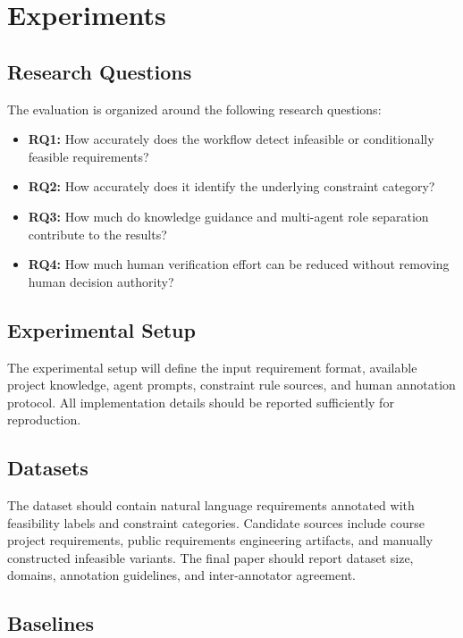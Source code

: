 \section{Experiments}
\label{experiments}

\subsection{Research Questions}
\label{exp:rqs}

The evaluation is organized around the following research questions:
\begin{itemize}[leftmargin=*]
  \item \textbf{RQ1:} How accurately does the workflow detect infeasible or conditionally feasible requirements?
  \item \textbf{RQ2:} How accurately does it identify the underlying constraint category?
  \item \textbf{RQ3:} How much do knowledge guidance and multi-agent role separation contribute to the results?
  \item \textbf{RQ4:} How much human verification effort can be reduced without removing human decision authority?
\end{itemize}

\subsection{Experimental Setup}
\label{exp:setup}

The experimental setup will define the input requirement format, available project knowledge, agent prompts, constraint rule sources, and human annotation protocol.
All implementation details should be reported sufficiently for reproduction.

\subsection{Datasets}
\label{exp:datasets}

The dataset should contain natural language requirements annotated with feasibility labels and constraint categories.
Candidate sources include course project requirements, public requirements engineering artifacts, and manually constructed infeasible variants.
The final paper should report dataset size, domains, annotation guidelines, and inter-annotator agreement.

\subsection{Baselines}
\label{exp:baselines}

